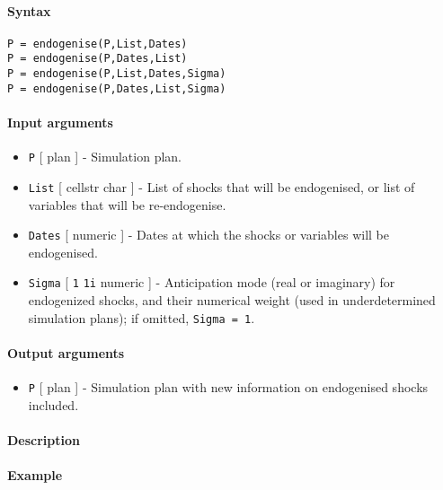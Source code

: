


	\paragraph{Syntax}

\begin{verbatim}
P = endogenise(P,List,Dates)
P = endogenise(P,Dates,List)
P = endogenise(P,List,Dates,Sigma)
P = endogenise(P,Dates,List,Sigma)
\end{verbatim}

\paragraph{Input arguments}

\begin{itemize}
\item
  \texttt{P} {[} plan {]} - Simulation plan.
\item
  \texttt{List} {[} cellstr \textbar{} char {]} - List of shocks that
  will be endogenised, or list of variables that will be re-endogenise.
\item
  \texttt{Dates} {[} numeric {]} - Dates at which the shocks or
  variables will be endogenised.
\item
  \texttt{Sigma} {[} \texttt{1} \textbar{} \texttt{1i} \textbar{}
  numeric {]} - Anticipation mode (real or imaginary) for endogenized
  shocks, and their numerical weight (used in underdetermined simulation
  plans); if omitted, \texttt{Sigma = 1}.
\end{itemize}

\paragraph{Output arguments}

\begin{itemize}
\itemsep1pt\parskip0pt
\item
  \texttt{P} {[} plan {]} - Simulation plan with new information on
  endogenised shocks included.
\end{itemize}

\paragraph{Description}

\paragraph{Example}


